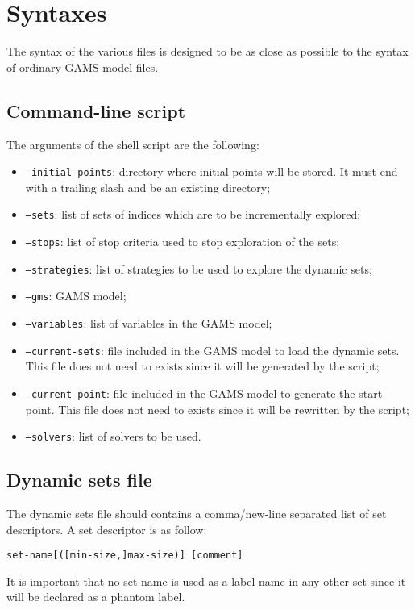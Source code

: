\section*{Syntaxes}

The syntax of the various files is designed to be as close as possible to the
syntax of ordinary GAMS model files.

\subsection*{Command-line script}

The arguments of the shell script are the following:\\
\begin{itemize}
\item \texttt{--initial-points}: directory where initial points will be
  stored. It must end with a trailing slash and be an existing directory;
\item \texttt{--sets}: list of sets of indices which are to be
  incrementally explored;
\item \texttt{--stops}: list of stop criteria used to stop exploration of
  the sets;
\item \texttt{--strategies}: list of strategies to be used to explore the dynamic
  sets;
\item \texttt{--gms}: GAMS model;
\item \texttt{--variables}: list of variables in the GAMS model;
\item \texttt{--current-sets}: file included in the GAMS model to load the
  dynamic sets. This file does not need to exists since it will be generated by
  the script;
\item \texttt{--current-point}: file included in the GAMS model to generate the
  start point. This file does not need to exists since it will be rewritten by
  the script;
\item \texttt{--solvers}: list of solvers to be used.
\end{itemize}

\subsection*{Dynamic sets file}

The dynamic sets file should contains a comma/new-line separated list of set descriptors.
A set descriptor is as follow:
\begin{center}
  \texttt{set-name[([min-size,]max-size)] [comment]}
\end{center}
It is important that no set-name is used as a label name in any other set since
it will be declared as a phantom label.

